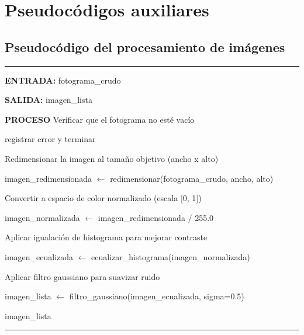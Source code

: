 \appendix
\chapter{Pseudocódigos auxiliares}
\label{anexo:Pseudocodigo}

\section{Pseudocódigo del procesamiento de imágenes}
\label{apend:procesa}
\begin{center}
\label{alg:pdi}
\end{center}
\vspace{-1.6cm}
\rule{\textwidth}{0.4pt}
\vspace{-0.9cm}

\begin{algorithmic}[1]

\Statex \textbf{ENTRADA:}
\Statex fotograma\_crudo

\Statex
\Statex \textbf{SALIDA:}
\Statex imagen\_lista

\Statex
\Statex \textbf{PROCESO}
\State Verificar que el fotograma no esté vacío


    \State registrar error y terminar

\EndIf

\Statex
\State Redimensionar la imagen al tamaño objetivo (ancho x alto)

\State imagen\_redimensionada $\gets$
redimensionar(fotograma\_crudo, ancho, alto)

\Statex
\State Convertir a espacio de color normalizado (escala [0, 1])

\State imagen\_normalizada $\gets$
imagen\_redimensionada / 255.0

\Statex
\State Aplicar igualación de histograma para mejorar contraste

\State imagen\_ecualizada $\gets$
ecualizar\_histograma(imagen\_normalizada)

\Statex
\State Aplicar filtro gaussiano para suavizar ruido

\State imagen\_lista $\gets$
filtro\_gaussiano(imagen\_ecualizada, sigma=0.5)

\Statex
\State \Return imagen\_lista

\end{algorithmic}
\vspace{-0.9cm}
\rule{\textwidth}{0.4pt}


